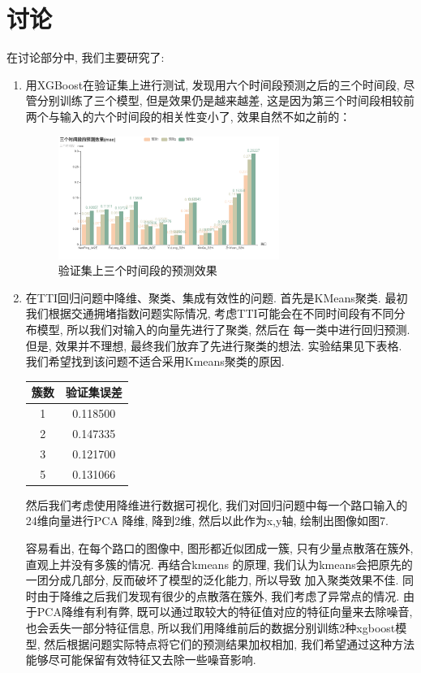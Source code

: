 \documentclass[a4paper,UTF8]{article}
\begin{document}
\section{讨论}
在讨论部分中, 我们主要研究了:
\begin{enumerate}
  \item 用XGBoost在验证集上进行测试, 发现用六个时间段预测之后的三个时间段, 尽管分别训练了三个模型, 但是效果仍是越来越差, 这是因为第三个时间段相较前两个与输入的六个时间段的相关性变小了, 效果自然不如之前的：
      \begin{figure}[!htbp]
        \centering
        \includegraphics[height=4cm]{bar2.png}
        \caption{验证集上三个时间段的预测效果}
      \end{figure}
  \item 在TTI回归问题中降维、聚类、集成有效性的问题. 首先是KMeans聚类. 最初我们根据交通拥堵指数问题实际情况, 考虑TTI可能会在不同时间段有不同分布模型, 所以我们对输入的向量先进行了聚类, 然后在 每一类中进行回归预测. 但是, 效果并不理想, 最终我们放弃了先进行聚类的想法. 实验结果见下表格. 我们希望找到该问题不适合采用Kmeans聚类的原因. 
      \begin{table}[!htbp]
      \centering
        \begin{tabular}{|c|c|}
          \hline
          簇数 & 验证集误差\\
          \hline
          1 & 0.118500\\
          \hline
          2 & 0.147335\\
          \hline
          3 & 0.121700\\
          \hline
          5 & 0.131066\\
          \hline
        \end{tabular}
      \end{table}

      然后我们考虑使用降维进行数据可视化, 我们对回归问题中每一个路口输入的24维向量进行PCA
      降维, 降到2维, 然后以此作为x,y轴, 绘制出图像如图7. 
      
      容易看出, 在每个路口的图像中, 图形都近似团成一簇, 只有少量点散落在簇外, 直观上并没有多簇的情况. 再结合kmeans
      的原理, 我们认为kmeans会把原先的一团分成几部分, 反而破坏了模型的泛化能力, 所以导致
      加入聚类效果不佳. 同时由于降维之后我们发现有很少的点散落在簇外, 我们考虑了异常点的情况. 由于PCA降维有利有弊, 既可以通过取较大的特征值对应的特征向量来去除噪音, 也会丢失一部分特征信息, 所以我们用降维前后的数据分别训练2种xgboost模型, 然后根据问题实际特点将它们的预测结果加权相加, 我们希望通过这种方法能够尽可能保留有效特征又去除一些噪音影响. 


\end{enumerate}
\end{document}
